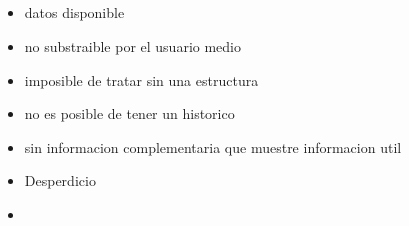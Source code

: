 \subsection*{}
\begin{itemize}

    \item datos disponible
    \item no substraible por el usuario medio
    \item imposible de tratar sin una estructura
    \item no es posible de tener un historico
    \item sin informacion complementaria que muestre informacion util
    \item Desperdicio
    \item \end{itemize}
    